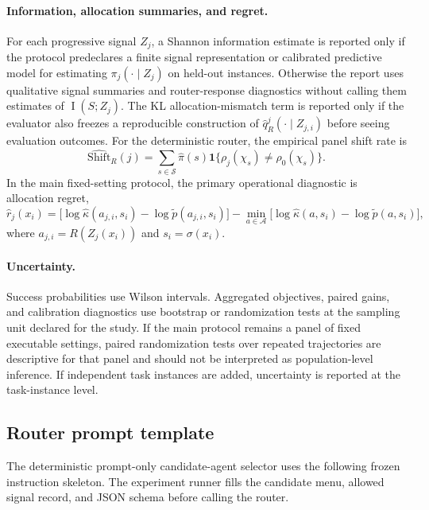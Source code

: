 \documentclass{article}
\DeclareMathOperator{\MI}{I}
\newcommand{\cA}{\mathcal{A}}
\newcommand{\cS}{\mathcal{S}}
\newcommand{\one}{\mathbf{1}}
\begin{document}
\paragraph{Information, allocation summaries, and regret.}
For each progressive signal $Z_j$, a Shannon information estimate is reported only if the protocol predeclares a finite signal representation or calibrated predictive model for estimating $\pi_j(\cdot\mid Z_j)$ on held-out instances.
Otherwise the report uses qualitative signal summaries and router-response diagnostics without calling them estimates of $\MI(S;Z_j)$.
The KL allocation-mismatch term is reported only if the evaluator also freezes a reproducible construction of $\hat q_R^j(\cdot\mid Z_{j,i})$ before seeing evaluation outcomes.
For the deterministic router, the empirical panel shift rate is
\[
\widehat{\mathrm{Shift}}_R(j)=
\sum_{s\in\cS}\hat\pi(s)\one\{\rho_j(\chi_s)\ne\rho_0(\chi_s)\}.
\]
In the main fixed-setting protocol, the primary operational diagnostic is allocation regret,
\[
\hat r_j(x_i)
=
\bigl[\log\hat\kappa(a_{j,i},s_i)-\log\tilde p(a_{j,i},s_i)\bigr]
-
\min_{a\in\cA}
\bigl[\log\hat\kappa(a,s_i)-\log\tilde p(a,s_i)\bigr],
\]
where $a_{j,i}=R(Z_j(x_i))$ and $s_i=\sigma(x_i)$.

\paragraph{Uncertainty.}
Success probabilities use Wilson intervals.
Aggregated objectives, paired gains, and calibration diagnostics use bootstrap or randomization tests at the sampling unit declared for the study.
If the main protocol remains a panel of fixed executable settings, paired randomization tests over repeated trajectories are descriptive for that panel and should not be interpreted as population-level inference.
If independent task instances are added, uncertainty is reported at the task-instance level.

\subsection{Router prompt template}
\label{app:router-prompt}

The deterministic prompt-only candidate-agent selector uses the following frozen
instruction skeleton. The experiment runner fills the candidate menu, allowed
signal record, and JSON schema before calling the router.
\end{document}
